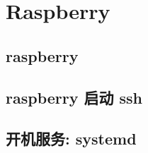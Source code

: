 \chapter{Raspberry}
    \section{raspberry}
        
        
        
    \section{raspberry 启动 ssh}
        
    \section{开机服务: systemd}
        
